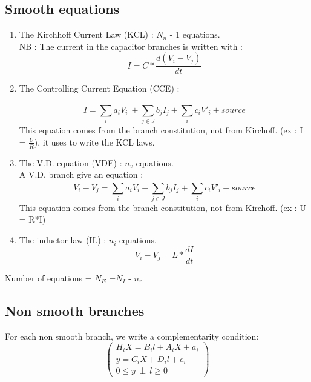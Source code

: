 \documentclass[10pt]{article}
\begin{document}
\subsection{Smooth equations\\}
\begin{enumerate}
  \item The Kirchhoff Current Law (KCL) : $N_{n}$ - 1 equations.\\
    NB : The current in the capacitor branches is written with :
    \[I = C*\frac{d(V_{i} - V_{j})}{dt}\]
  \item The Controlling Current Equation (CCE) :

     \[I=\sum_{i}^{}a_{i}V_{i}\ + \sum_{j \in J}^{}b_{j}I_{j}  +  \sum_{i}^{}c_{i}V'_{i} + source\]
     This equation comes from the branch constitution, not from Kirchoff. (ex : I = $\frac{U}{R}$),
     it uses to write the KCL laws.
  \item The V.D. equation (VDE) : $n_{v}$ equations.\\
    A V.D. branch give an equation :
    \[V_{i}-V_{j} = \sum_{i}^{}a_{i}V_{i} + \sum_{j\in J}^{}b_{j}I_{j} +  \sum_{i}^{}c_{i}V'_{i} +
    source\]
    This equation comes from the branch constitution, not from Kirchoff. (ex : U = R*I)
  \item The inductor law (IL) : $n_{i}$ equations.
     \[V_{i} - V_{j} = L*\frac{dI}{dt}\]

\end{enumerate}
Number of equations = $N_{E}$ =$N_{I}$ - $n_{r}$
\subsection{Non smooth branches}

For each non smooth branch, we write a complementarity condition:\\
\[\left(\begin{array}{c}
H_{i}X = B_{i}l+A_{i}X + a_{i}\\
y=C_{i}X+D_{i}l+e_{i}\\
0 \leq y \, \perp \, l \geq 0
\end{array}\right)\]

\newpage
\end{document}
